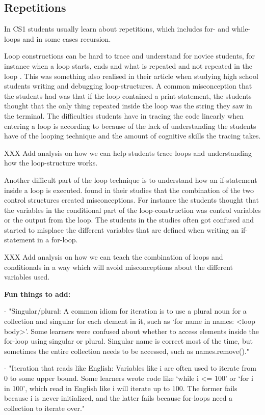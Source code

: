 \subsection{Repetitions}

In CS1 students usually learn about repetitions, which includes for- and while-loops and in some cases recursion.

Loop constructions can be hard to trace and understand for novice students, for instance when a loop starts, ends and what is repeated and not repeated in the loop \parencite{Sekiya2013,KumarVeerasamy2016,Kaczmarczyk2010}. This was something \textcite{Sleeman1984} also realised in their article when studying high school students writing and debugging loop-structures. A common misconception that the students had was that if the loop contained a print-statement, the students thought that the only thing  repeated inside the loop was the string they saw in the terminal. The difficulties students have in tracing the code linearly when entering a loop is according to \textcite{KumarVeerasamy2016} because of the lack of understanding the students have of the looping technique and the amount of cognitive skills the tracing takes.

XXX Add analysis on how we can help students trace loops and understanding how the loop-structure works.

Another difficult part of the loop technique is to understand how an if-statement inside a loop is executed. \textcite{Sekiya2013} found in their studies that the combination of the two control structures created misconceptions. For instance the students thought that the variables in the conditional part of the loop-construction was control variables or the output from the loop. The students in the studies often got confused and started to misplace the different variables that are defined when writing an if-statement in a for-loop.

XXX Add analysis on how we can teach the combination of loops and conditionals in a way which will avoid misconceptions about the different variables used. 


\textbf{Fun things to add:}

- "Singular/plural: A common idiom for iteration is to use a plural noun for a collection and singular for each element in it, such as ‘for name in names: <loop body>’. Some learners were confused about whether to access elements inside the for-loop using singular or plural. Singular name is correct most of the time, but sometimes the entire collection needs to be accessed, such as names.remove()." \parencite{GuoMarkelZhang2020}

- "Iteration that reads like English: Variables like i are often used to iterate from 0 to some upper bound. Some learners wrote code like ‘while i <= 100’ or ‘for i in 100’, which read in English like i will iterate up to 100. The former fails because i is never initialized, and the latter fails because for-loops need a collection to iterate over." \parencite{GuoMarkelZhang2020}